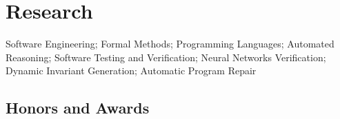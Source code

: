 \documentclass[11pt]{article}
\begin{document}
    \section{Research}

    \begin{description}[before=\small]
      \item Software Engineering; Formal Methods; Programming Languages; Automated Reasoning; Software Testing and Verification; Neural Networks Verification; Dynamic Invariant Generation; Automatic Program Repair
    \end{description}

    \subsection{Honors and Awards}
\end{document}
